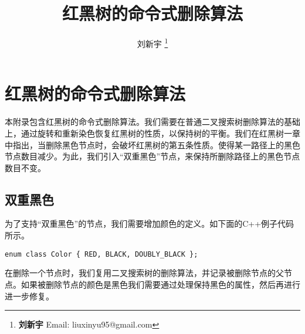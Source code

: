 \documentclass{ctexart}
\begin{document}


\title{红黑树的命令式删除算法}

\author{刘新宇
\thanks{{\bfseries 刘新宇} \newline
  Email: liuxinyu95@gmail.com \newline}
  }

\maketitle
\fi


\ifx\wholebook\relax
\chapter{红黑树的命令式删除算法}
\fi


本附录包含红黑树的命令式删除算法。我们需要在普通二叉搜索树删除算法的基础上，通过旋转和重新染色恢复红黑树的性质，以保持树的平衡。我们在红黑树一章中指出，当删除黑色节点时，会破坏红黑树的第五条性质。使得某一路径上的黑色节点数目减少。为此，我们引入“双重黑色”节点，来保持所删除路径上的黑色节点数目不变。

\section{双重黑色}

为了支持“双重黑色”的节点，我们需要增加颜色的定义。如下面的C++例子代码所示。

\lstset{language=C++}
\begin{lstlisting}
enum class Color { RED, BLACK, DOUBLY_BLACK };
\end{lstlisting}

在删除一个节点时，我们复用二叉搜索树的删除算法，并记录被删除节点的父节点。如果被删除节点的颜色是黑色我们需要通过处理保持黑色的属性，然后再进行进一步修复。
\end{document}
